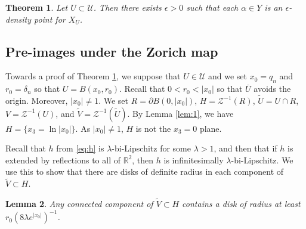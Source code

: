 \documentclass[11pt]{amsart}
\newtheorem{theorem}{Theorem}[section]
\newtheorem{lemma}[theorem]{Lemma}
\numberwithin{equation}{section}
\theoremstyle{definition}
\theoremstyle{definition}
\theoremstyle{definition}
\newcommand{\R}{\mathbb{R}}
\begin{document}
\begin{theorem}
    \label{thm:2}
Let $U\subset \mathcal{U}$. Then there exists $\epsilon >0$ such that each $\alpha \in Y$ is an $\epsilon$-density point for $X_U$.
\end{theorem}

\subsection{Pre-images under the Zorich map}

Towards a proof of Theorem \ref{thm:2}, we suppose that $U \in \mathcal{U}$ and we set $x_0 = q_n$ and $r_0 = \delta_n$ so that $U = B(x_0,r_0)$. Recall that $0<r_0<|x_0|$ so that $\overline{U}$ avoids the origin. Moreover, $|x_0|\neq 1$. We set $R = \partial B(0,|x_0|)$, $H = \mathcal{Z}^{-1}(R)$, $\widetilde{U} = U\cap R$, $V = \mathcal{Z}^{-1}(U)$, and $\widetilde{V} =\mathcal{Z}^{-1}(\widetilde{U})$. By Lemma \ref{lem:1}, we have $H = \{ x_3 = \ln |x_0| \}$. As $|x_0| \neq 1$, $H$ is not the $x_3 = 0$ plane.

Recall that $h$ from \eqref{eq:h} is $\lambda$-bi-Lipschitz for some $\lambda >1$, and then that if $h$ is extended by reflections to all of $\R^2$, then $h$ is infinitesimally $\lambda$-bi-Lipschitz. We use this to show that there are disks of definite radius in each component of $\widetilde{V} \subset H$.

\begin{lemma}
    \label{lem:radius}
Any connected component of $\widetilde{V} \subset H$ contains a disk of radius at least $r_0(8\lambda e^{|x_0|})^{-1}$.
\end{lemma}
\end{document}
